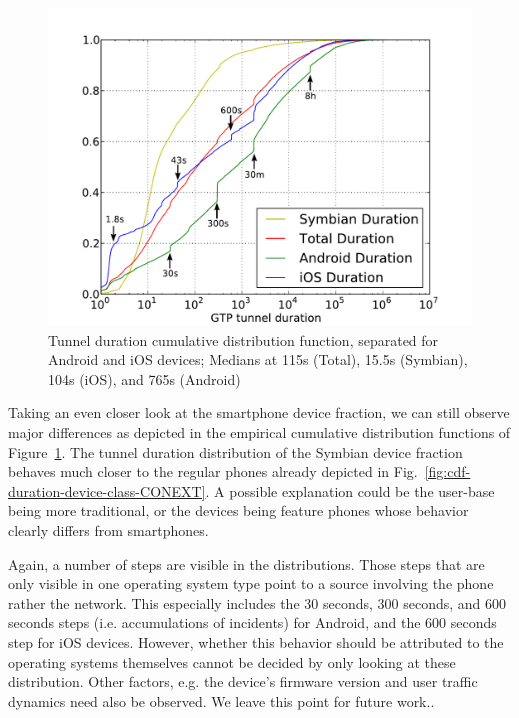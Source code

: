 
\begin{figure}
	\centering
	\includegraphics[width=\columnwidth]{images/tunnel-dur-os-cdf-mod.pdf}
	\caption{Tunnel duration cumulative distribution function, separated for Android and iOS devices; Medians at 115s (Total), 15.5s (Symbian), 104s (iOS), and 765s (Android)}
	\label{fig:cdf-duration-os-CONEXT}
\end{figure}

Taking an even closer look at the smartphone device fraction, we can still observe major differences as depicted in the empirical cumulative distribution functions of Figure~\ref{fig:cdf-duration-os-CONEXT}. The tunnel duration distribution of the Symbian device fraction behaves much closer to the regular phones already depicted in Fig.~\ref{fig:cdf-duration-device-class-CONEXT}. A possible explanation could be the user-base being more traditional, or the devices being feature phones whose behavior clearly differs from smartphones.

Again, a number of steps are visible in the distributions. %
Those steps that are only visible in one operating system type point to a source involving the phone rather the network. This especially includes the 30 seconds, 300 seconds, and 600 seconds steps (i.e. accumulations of incidents) for Android, and the 600 seconds step for iOS devices. However, whether this behavior should be attributed to the operating systems themselves cannot be decided by only looking at these distribution. Other factors, e.g. the device's firmware version and user traffic dynamics need also be observed. We leave this point for future work..


